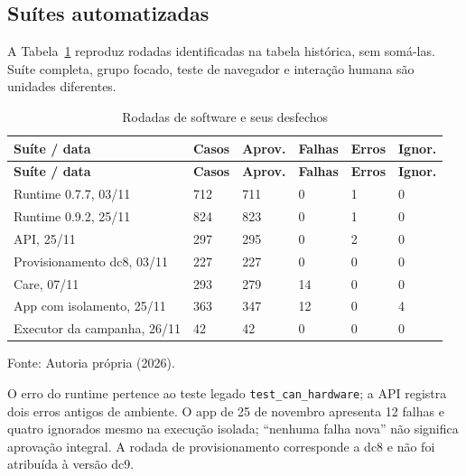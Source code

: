 \subsection{Suítes automatizadas}
A Tabela~\ref{tab:result-software} reproduz rodadas identificadas na tabela histórica, sem somá-las. Suíte completa, grupo focado, teste de navegador e interação humana são unidades diferentes.
{\small\setlength{\tabcolsep}{3pt}\begin{longtable}{p{}p{}p{}p{}p{}p{}}
\caption{Rodadas de software e seus desfechos}\label{tab:result-software}\\
\hline\textbf{Suíte / data} & \textbf{Casos} & \textbf{Aprov.} & \textbf{Falhas} & \textbf{Erros} & \textbf{Ignor.}\\\hline\endfirsthead
\hline\textbf{Suíte / data} & \textbf{Casos} & \textbf{Aprov.} & \textbf{Falhas} & \textbf{Erros} & \textbf{Ignor.}\\\hline\endhead
Runtime 0.7.7, 03/11 & 712 & 711 & 0 & 1 & 0\\\hline
Runtime 0.9.2, 25/11 & 824 & 823 & 0 & 1 & 0\\\hline
API, 25/11 & 297 & 295 & 0 & 2 & 0\\\hline
Provisionamento dc8, 03/11 & 227 & 227 & 0 & 0 & 0\\\hline
Care, 07/11 & 293 & 279 & 14 & 0 & 0\\\hline
App com isolamento, 25/11 & 363 & 347 & 12 & 0 & 4\\\hline
Executor da campanha, 26/11 & 42 & 42 & 0 & 0 & 0\\\hline
\end{longtable}\noindent Fonte: Autoria própria (2026).\par}

O erro do runtime pertence ao teste legado \texttt{test\_can\_hardware}; a API registra dois erros antigos de ambiente. O app de 25 de novembro apresenta 12 falhas e quatro ignorados mesmo na execução isolada; ``nenhuma falha nova'' não significa aprovação integral. A rodada de provisionamento corresponde a dc8 e não foi atribuída à versão dc9. 

